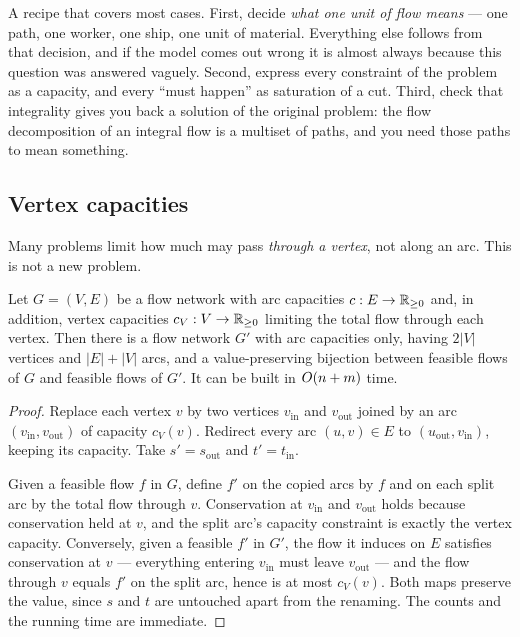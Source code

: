 \begin{intuition}
A recipe that covers most cases. First, decide \emph{what one unit of flow
means} --- one path, one worker, one ship, one unit of material. Everything
else follows from that decision, and if the model comes out wrong it is almost
always because this question was answered vaguely. Second, express every
constraint of the problem as a capacity, and every ``must happen'' as
saturation of a cut. Third, check that integrality gives you back a solution of
the original problem: the flow decomposition of an integral flow is a
multiset of paths, and you need those paths to mean something.
\end{intuition}

\subsection{Vertex capacities}
\label{sec:flow-vertex-capacities}

Many problems limit how much may pass \emph{through a vertex}, not along an
arc. This is not a new problem.

\begin{lemma}\label{lem:flow-vertex-splitting}
Let $G = (V,E)$ be a flow network with arc capacities $c : E \to \mathbb{R}_{\ge 0}$
and, in addition, vertex capacities $c_V : V \to \mathbb{R}_{\ge 0}$ limiting the total
flow through each vertex. Then there is a flow network $G'$ with arc capacities
only, having $2|V|$ vertices and $|E| + |V|$ arcs, and a value-preserving
bijection between feasible flows of $G$ and feasible flows of $G'$. It can be
built in $O\!\left(n+m\right)$ time.
\end{lemma}

\begin{proof}
Replace each vertex $v$ by two vertices $v_{\mathrm{in}}$ and
$v_{\mathrm{out}}$ joined by an arc $(v_{\mathrm{in}}, v_{\mathrm{out}})$ of
capacity $c_V(v)$. Redirect every arc $(u,v) \in E$ to
$(u_{\mathrm{out}}, v_{\mathrm{in}})$, keeping its capacity. Take
$s' = s_{\mathrm{out}}$ and $t' = t_{\mathrm{in}}$.

Given a feasible flow $f$ in $G$, define $f'$ on the copied arcs by $f$ and on
each split arc by the total flow through $v$. Conservation at
$v_{\mathrm{in}}$ and $v_{\mathrm{out}}$ holds because conservation held at
$v$, and the split arc's capacity constraint is exactly the vertex capacity.
Conversely, given a feasible $f'$ in $G'$, the flow it induces on $E$ satisfies
conservation at $v$ --- everything entering $v_{\mathrm{in}}$ must leave
$v_{\mathrm{out}}$ --- and the flow through $v$ equals $f'$ on the split arc,
hence is at most $c_V(v)$. Both maps preserve the value, since $s$ and $t$ are
untouched apart from the renaming. The counts and the running time are
immediate.
\end{proof}


